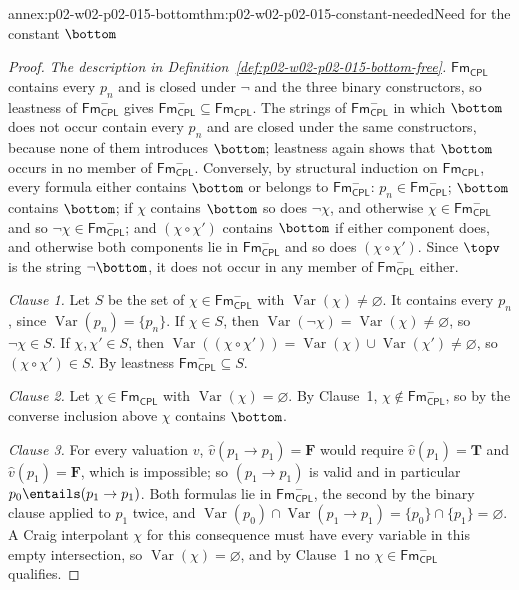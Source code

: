 \begin{annexitem}{annex:p02-w02-p02-015-bottom}{thm:p02-w02-p02-015-constant-needed}{Need for the constant \(\bottom\)}
\begin{proof}
\emph{The description in Definition~\ref{def:p02-w02-p02-015-bottom-free}.}
\(\mathsf{Fm}_{\mathsf{CPL}}\) contains every \(p_n\) and is closed under \(\neg\) and the
three binary constructors, so leastness of \(\mathsf{Fm}_{\mathsf{CPL}}^{-}\) gives
\(\mathsf{Fm}_{\mathsf{CPL}}^{-}\subseteq\mathsf{Fm}_{\mathsf{CPL}}\).  The strings of \(\mathsf{Fm}_{\mathsf{CPL}}^{-}\) in
which \(\bottom\) does not occur contain every \(p_n\) and are closed under the
same constructors, because none of them introduces \(\bottom\); leastness
again shows that \(\bottom\) occurs in no member of \(\mathsf{Fm}_{\mathsf{CPL}}^{-}\).
Conversely, by structural induction on \(\mathsf{Fm}_{\mathsf{CPL}}\), every formula either
contains \(\bottom\) or belongs to \(\mathsf{Fm}_{\mathsf{CPL}}^{-}\): \(p_n\in
\mathsf{Fm}_{\mathsf{CPL}}^{-}\); \(\bottom\) contains \(\bottom\); if \(\chi\) contains
\(\bottom\) so does \(\neg\chi\), and otherwise \(\chi\in\mathsf{Fm}_{\mathsf{CPL}}^{-}\) and
so \(\neg\chi\in\mathsf{Fm}_{\mathsf{CPL}}^{-}\); and \((\chi\circ\chi')\) contains \(\bottom\)
if either component does, and otherwise both components lie in
\(\mathsf{Fm}_{\mathsf{CPL}}^{-}\) and so does \((\chi\circ\chi')\).  Since \(\topv\) is the
string \(\neg\bottom\), it does not occur in any member of
\(\mathsf{Fm}_{\mathsf{CPL}}^{-}\) either.

\emph{Clause 1.}  Let \(S\) be the set of \(\chi\in\mathsf{Fm}_{\mathsf{CPL}}^{-}\) with
\(\operatorname{Var}(\chi)\neq\varnothing\).  It contains every \(p_n\),
since \(\operatorname{Var}(p_n)=\{p_n\}\).  If \(\chi\in S\), then
\(\operatorname{Var}(\neg\chi)=\operatorname{Var}(\chi)\neq\varnothing\), so
\(\neg\chi\in S\).  If \(\chi,\chi'\in S\), then
\(\operatorname{Var}((\chi\circ\chi'))=\operatorname{Var}(\chi)\cup
\operatorname{Var}(\chi')\neq\varnothing\), so \((\chi\circ\chi')\in S\).
By leastness \(\mathsf{Fm}_{\mathsf{CPL}}^{-}\subseteq S\).

\emph{Clause 2.}  Let \(\chi\in\mathsf{Fm}_{\mathsf{CPL}}\) with
\(\operatorname{Var}(\chi)=\varnothing\).  By Clause~1, \(\chi\notin
\mathsf{Fm}_{\mathsf{CPL}}^{-}\), so by the converse inclusion above \(\chi\) contains
\(\bottom\).

\emph{Clause 3.}  For every valuation \(v\),
\(\widehat v(p_1\to p_1)=\mathbf{F}\) would require \(\widehat v(p_1)=\mathbf{T}\) and
\(\widehat v(p_1)=\mathbf{F}\), which is impossible; so \((p_1\to p_1)\) is valid
and in particular \(p_0\entails(p_1\to p_1)\).  Both formulas lie in
\(\mathsf{Fm}_{\mathsf{CPL}}^{-}\), the second by the binary clause applied to \(p_1\) twice,
and \(\operatorname{Var}(p_0)\cap\operatorname{Var}(p_1\to p_1)=
\{p_0\}\cap\{p_1\}=\varnothing\).  A Craig interpolant \(\chi\) for this
consequence must have every variable in this empty intersection, so
\(\operatorname{Var}(\chi)=\varnothing\), and by Clause~1 no
\(\chi\in\mathsf{Fm}_{\mathsf{CPL}}^{-}\) qualifies.


\end{proof}
\end{annexitem}
